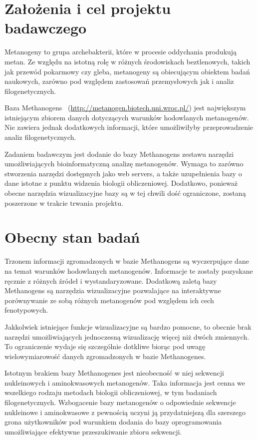 \documentclass{article}
\author{Michał Burdukiewicz, Przemysław Gagat}
\title{Moduł bioinformatyczny bazy metanogenów\linebreak \vskip{} 
\large{Projekt badawczy Doktoranckiego Koła Naukowego Bioinformatyki}}
\date{}
\begin{document}
\maketitle

\section{Założenia i cel projektu badawczego}

Metanogeny to grupa archebakterii, które w procesie oddychania produkują metan. 
Ze względu na istotną rolę w różnych środowiskach beztlenowych, takich jak 
przewód pokarmowy czy gleba, metanogeny są obiecującym obiektem badań 
naukowych, zarówno pod względem zastosowań przemysłowych jak i analiz 
filogenetycznych.

Baza Methanogens~\citep{jablonski_methanogenic_2015} 
(\url{http://metanogen.biotech.uni.wroc.pl/}) jest największym 
istniejącym zbiorem danych dotyczących warunków hodowlanych metanogenów. Nie 
zawiera jednak dodatkowych informacji, które umożliwiłyby przeprowadzenie 
analiz filogenetycznych.

Zadaniem badawczym jest dodanie do bazy Methanogens zestawu narzędzi 
umożliwiających bioinformatyczną analizę metanogenów. Wymaga to zarówno 
stworzenia narzędzi dostępnych jako web servers, a także uzupełnienia bazy o 
dane istotne z punktu widzenia biologii obliczeniowej. Dodatkowo, ponieważ 
obecne narzędzia wizualizacyjne bazy są w tej chwili dość ograniczone, zostaną 
poszerzone w 
trakcie trwania projektu.


\section{Obecny stan badań}

Trzonem informacji zgromadzonych w bazie Methanogens są wyczerpujące dane na 
temat warunków hodowlanych metanogenów. Informacje te zostały pozyskane ręcznie 
z różnych źródeł i wystandaryzowane. Dodatkową zaletą bazy Methanogens są 
narzędzia wizualizacyjne pozwalające na interaktywne porównywanie ze sobą 
różnych metanogenów pod względem ich cech fenotypowych. 

Jakkolwiek istniejące funkcje wizualizacyjne są bardzo pomocne, to obecnie brak 
narzędzi umożliwiających jednoczesną wizualizację więcej niż dwóch zmiennych. 
To ograniczenie wydaje się szczególnie dotkliwe biorąc pod uwagę 
wielowymiarowość danych zgromadzonych w bazie Methanogenes. 

Istotnym brakiem bazy Methanogenes jest nieobecność w niej sekwencji 
nukleinowych i aminokwasowych metanogenów. Taka informacja jest cenna we 
wszelkiego rodzaju metodach biologii obliczeniowej, w tym 
badaniach filogenetycznych. Wzbogacenie bazy metanogenów o odpowiednie 
sekwencje nukleinowe i aminokwasowe z pewnością uczyni ją przydatniejszą dla 
szerszego grona użytkowników pod warunkiem dodania do bazy oprogramowania 
umożliwiające efektywne przeszukiwanie zbioru sekwencji.
\end{document}
